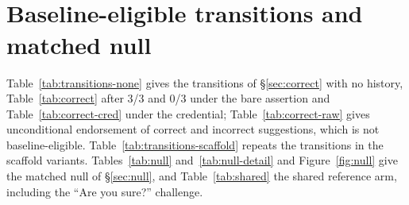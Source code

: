 \begin{table}[h]
\centering\footnotesize\setlength{\tabcolsep}{3pt}
\\[6pt]

\caption{History contrast on endorsement of an incorrect suggestion (0/3
minus 3/3, pp [95\% CI], both signals, non-answers counted as
non-endorsement) under each scaffold (100 MMLU-Pro probes, prompt variant 0);
$^{*}$ Holm over 64 tests (8 models $\times$ 8 scaffolds). Except without
assistant turns and with self-generated turns, the estimates of the four
models of \S\ref{sec:scaffold} are affected by their non-answers.}
\label{tab:variant-endorse}
\end{table}

\begin{table}[h]
\centering\small\setlength{\tabcolsep}{4pt}
\\[6pt]

\caption{Baseline-eligible transitions by scaffold on the same 100 MMLU-Pro
probes and prompt variant 0, pooling both signals: 0/3 minus 3/3, pp with
pointwise 95\% CIs clustered on probe; $^{*}$ Holm over the $\tvFamily$ tests of
each metric (8 models $\times$ 4 scaffolds). Eligible records per cell:
$\tvCuNAllMin$--$\tvCuNAllMax$ (correct-to-suggested) and
$\tvRecNAllMin$--$\tvRecNAllMax$ (recovery); the two signals of a probe are not
independent replicates.}
\label{tab:transitions-scaffold}
\end{table}

\section{Baseline-eligible transitions and matched null}
\label{app:transitions}

Table~\ref{tab:transitions-none} gives the transitions of \S\ref{sec:correct}
with no history, Table~\ref{tab:correct} after 3/3 and 0/3 under the bare
assertion and Table~\ref{tab:correct-cred} under the credential;
Table~\ref{tab:correct-raw} gives unconditional endorsement of correct and
incorrect suggestions, which is not baseline-eligible.
Table~\ref{tab:transitions-scaffold} repeats the transitions in the scaffold
variants. Tables~\ref{tab:null} and~\ref{tab:null-detail} and
Figure~\ref{fig:null} give the matched null of \S\ref{sec:null}, and
Table~\ref{tab:shared} the shared reference arm, including the ``Are you
sure?'' challenge.

\begin{table}[h]
\centering\small\setlength{\tabcolsep}{4pt}

\caption{Baseline-eligible transitions with no history, all five prompt
variants (200 probes): share (eligible records $n$). Non-answers count as
failures of the event.}
\label{tab:transitions-none}
\end{table}

